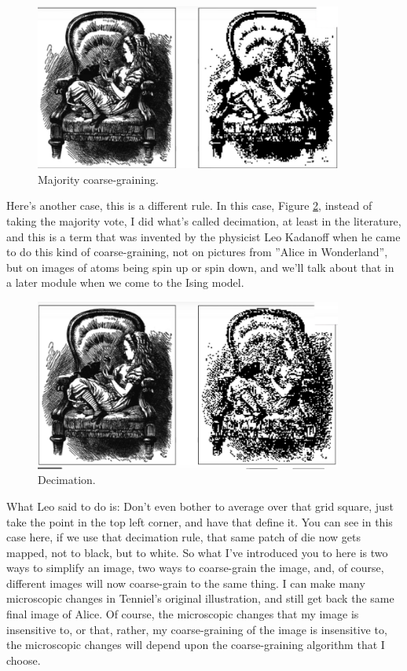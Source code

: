 \documentclass[]{article}
\begin{document}
\begin{figure}[H]
	\caption{Majority coarse-graining.}\label{fig:alice:result:coarse:graining}
	\includegraphics[width=0.9\textwidth]{Alice4}
\end{figure}

Here's another case, this is a different rule.
In this case, Figure \ref{fig:alice:result:decimation}, instead of taking the majority vote, I did what's called decimation,
at least in the literature, and this is a term that was invented
by the physicist Leo Kadanoff\cite{kadanoff2000statistical}
when he came to do this kind of coarse-graining, not on pictures
from ''Alice in Wonderland'', but on images of atoms
being spin up or spin down, and we'll talk about that
in a later module when we come to the Ising model.
\begin{figure}[H]
	\caption{Decimation.}\label{fig:alice:result:decimation}
	\includegraphics[width=0.9\textwidth]{Alice5}
\end{figure}

What Leo said to do is: Don't even bother to average over that grid square, just take the point in the top left corner,
and have that define it. You can see in this case here, if we use that decimation rule,
that same patch of die now gets mapped,
not to black, but to white.
So what I've introduced you to here
is two ways to simplify an image,
two ways to coarse-grain the image,
and, of course, different images
will now coarse-grain to the same thing.
I can make many microscopic changes
in Tenniel's original illustration,
and still get back
the same final image of Alice.
Of course, the microscopic changes
that my image is insensitive to,
or that, rather, my coarse-graining
of the image is insensitive to,
the microscopic changes will depend upon
the coarse-graining algorithm
that I choose.
\end{document}
